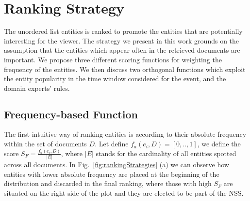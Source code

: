 \documentclass{llncs}
\begin{document}
\section{Ranking Strategy}
\label{sec:Ranking}
The unordered list entities is ranked to promote the entities that are potentially interesting for the viewer. The strategy we present in this work grounds on the assumption that the entities which appear often in the retrieved documents are important. We propose three different scoring functions for weighting the frequency of the entities. We then discuss two orthogonal functions which exploit the entity popularity in the time window considered for the event, and the domain experts' rules.

\subsection{Frequency-based Function}
The first intuitive way of ranking entities is according to their absolute frequency within the set of documents $D$. Let define $f_a(e_i, D)=[0,..,1]$, we define the score $S_F = \frac{ f_a(e_i, D) }{ |E| } $, where $|E|$ stands for the cardinality of all entities spotted across all documents. 
In Fig.~\ref{fig:rankingStrategies} (a) we can observe how entities with lower absolute frequency are placed at the beginning of the distribution and discarded in the final ranking, where those with high $S_F$ are situated on the right side of the plot and they are elected to be part of the NSS.
\end{document}
